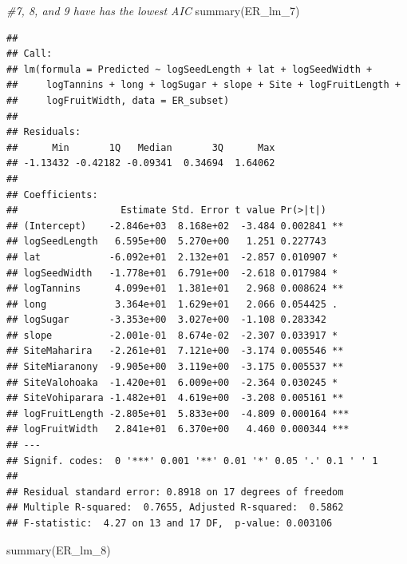 \documentclass[
  12pt,
]{article}
\newenvironment{Shaded}{\begin{snugshade}}{\end{snugshade}}
\newcommand{\CommentTok}[1]{\textcolor[rgb]{0.56,0.35,0.01}{\textit{#1}}}
\newcommand{\FunctionTok}[1]{\textcolor[rgb]{0.00,0.00,0.00}{#1}}
\newcommand{\NormalTok}[1]{#1}
\begin{document}
\begin{Shaded}
\begin{Highlighting}[]
\CommentTok{\#7, 8, and 9 have has the lowest AIC}
\FunctionTok{summary}\NormalTok{(ER\_lm\_7)}
\end{Highlighting}
\end{Shaded}

\begin{verbatim}
## 
## Call:
## lm(formula = Predicted ~ logSeedLength + lat + logSeedWidth + 
##     logTannins + long + logSugar + slope + Site + logFruitLength + 
##     logFruitWidth, data = ER_subset)
## 
## Residuals:
##      Min       1Q   Median       3Q      Max 
## -1.13432 -0.42182 -0.09341  0.34694  1.64062 
## 
## Coefficients:
##                  Estimate Std. Error t value Pr(>|t|)    
## (Intercept)    -2.846e+03  8.168e+02  -3.484 0.002841 ** 
## logSeedLength   6.595e+00  5.270e+00   1.251 0.227743    
## lat            -6.092e+01  2.132e+01  -2.857 0.010907 *  
## logSeedWidth   -1.778e+01  6.791e+00  -2.618 0.017984 *  
## logTannins      4.099e+01  1.381e+01   2.968 0.008624 ** 
## long            3.364e+01  1.629e+01   2.066 0.054425 .  
## logSugar       -3.353e+00  3.027e+00  -1.108 0.283342    
## slope          -2.001e-01  8.674e-02  -2.307 0.033917 *  
## SiteMaharira   -2.261e+01  7.121e+00  -3.174 0.005546 ** 
## SiteMiaranony  -9.905e+00  3.119e+00  -3.175 0.005537 ** 
## SiteValohoaka  -1.420e+01  6.009e+00  -2.364 0.030245 *  
## SiteVohiparara -1.482e+01  4.619e+00  -3.208 0.005161 ** 
## logFruitLength -2.805e+01  5.833e+00  -4.809 0.000164 ***
## logFruitWidth   2.841e+01  6.370e+00   4.460 0.000344 ***
## ---
## Signif. codes:  0 '***' 0.001 '**' 0.01 '*' 0.05 '.' 0.1 ' ' 1
## 
## Residual standard error: 0.8918 on 17 degrees of freedom
## Multiple R-squared:  0.7655, Adjusted R-squared:  0.5862 
## F-statistic:  4.27 on 13 and 17 DF,  p-value: 0.003106
\end{verbatim}

\begin{Shaded}
\begin{Highlighting}[]
\FunctionTok{summary}\NormalTok{(ER\_lm\_8)}
\end{Highlighting}
\end{Shaded}
\end{document}

